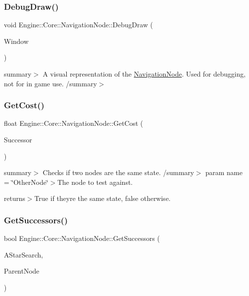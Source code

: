 \subsubsection{\texorpdfstring{Debug\+Draw()}{DebugDraw()}}
{\footnotesize\ttfamily void Engine\+::\+Core\+::\+Navigation\+Node\+::\+Debug\+Draw (\begin{DoxyParamCaption}\item[{shared\+\_\+ptr$<$ Render\+Window $>$}]{Window }\end{DoxyParamCaption})}

summary$>$ A visual representation of the \hyperlink{struct_engine_1_1_core_1_1_navigation_node}{Navigation\+Node}. Used for debugging, not for in game use. /summary$>$ \mbox{\label{struct_engine_1_1_core_1_1_navigation_node_a2d2f49adb68c3b880b750875ad15a50b}} 
\subsubsection{\texorpdfstring{Get\+Cost()}{GetCost()}}
{\footnotesize\ttfamily float Engine\+::\+Core\+::\+Navigation\+Node\+::\+Get\+Cost (\begin{DoxyParamCaption}\item[{\hyperlink{struct_engine_1_1_core_1_1_navigation_node}{Navigation\+Node} \&}]{Successor }\end{DoxyParamCaption})}

summary$>$ Checks if two nodes are the same state. /summary$>$ param name = \char`\"{}\+Other\+Node\char`\"{}$>$The node to test against.

returns$>$True if they\textquotesingle{}re the same state, false otherwise.\mbox{\label{struct_engine_1_1_core_1_1_navigation_node_a4e049fbcda1bb269303da91692d05033}} 
\subsubsection{\texorpdfstring{Get\+Successors()}{GetSuccessors()}}
{\footnotesize\ttfamily bool Engine\+::\+Core\+::\+Navigation\+Node\+::\+Get\+Successors (\begin{DoxyParamCaption}\item[{\hyperlink{class_a_star_search}{A\+Star\+Search}$<$ \hyperlink{struct_engine_1_1_core_1_1_navigation_node}{Navigation\+Node} $>$ $\ast$}]{A\+Star\+Search,  }\item[{\hyperlink{struct_engine_1_1_core_1_1_navigation_node}{Navigation\+Node} $\ast$}]{Parent\+Node }\end{DoxyParamCaption})}

